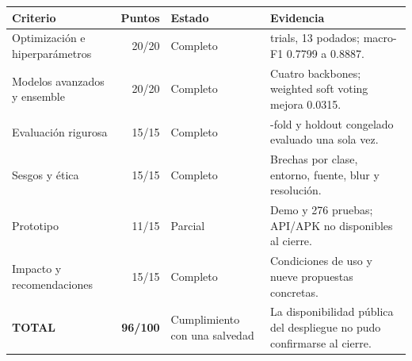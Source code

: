 \begin{tabularx}{\textwidth}{>{\raggedright\arraybackslash}X r l >{\raggedright\arraybackslash}X}
\toprule
\textbf{Criterio} & \textbf{Puntos} & \textbf{Estado} & \textbf{Evidencia} \\
\midrule
Optimización e hiperparámetros & 20/20 & Completo & 30 trials, 13 podados; macro-F1 0.7799 a 0.8887. \\
Modelos avanzados y ensemble & 20/20 & Completo & Cuatro backbones; weighted soft voting mejora 0.0315. \\
Evaluación rigurosa & 15/15 & Completo & 5-fold y holdout congelado evaluado una sola vez. \\
Sesgos y ética & 15/15 & Completo & Brechas por clase, entorno, fuente, blur y resolución. \\
Prototipo & 11/15 & Parcial & Demo y 276 pruebas; API/APK no disponibles al cierre. \\
Impacto y recomendaciones & 15/15 & Completo & Condiciones de uso y nueve propuestas concretas. \\
\midrule
\textbf{TOTAL} & \textbf{96/100} & Cumplimiento con una salvedad & La disponibilidad pública del despliegue no pudo confirmarse al cierre. \\
\bottomrule
\end{tabularx}
